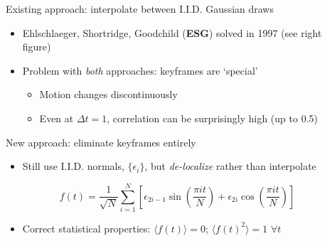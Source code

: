 \documentclass[final,t]{beamer}\usepackage[]{graphicx}\usepackage[]{color}
\newenvironment{knitrout}{}{} %
\begin{document}
\begin{frame}[fragile]
\begin{columns}[T,onlytextwidth]
\begin{column}{.325\linewidth}
\begin{block}{Existing approach:
        interpolate between I.I.D. Gaussian draws}
\begin{knitrout}
\end{knitrout}

        \begin{itemize}
          \item Ehlschlaeger, Shortridge, Goodchild (\textbf{ESG})
            solved in 1997 (see right figure)
          \item Problem with \textit{both} approaches: keyframes are `special'
            \begin{itemize}
              \item Motion changes discontinuously
              \item Even at $\Delta t = 1$, correlation can be surprisingly high
                (up to 0.5)
            \end{itemize}
        \end{itemize}
      \end{block}

      \begin{block}{New approach: eliminate keyframes entirely}
        \begin{itemize}
          \item Still use I.I.D. normals, $\{\epsilon_i\}$,
            but \textit{de-localize} rather than interpolate
        \end{itemize}
        \begin{equation*}
          f(t) = \frac{1}{\sqrt{N}} \sum_{i=1}^N
          \left[
            \epsilon_{2i-1}\sin\left(\frac{\pi i t}{N}\right) +
            \epsilon_{2i}  \cos\left(\frac{\pi i t}{N}\right)
          \right]
        \end{equation*}
        \begin{itemize}
          \item Correct statistical properties: 
            $\langle f(t) \rangle = 0$;
            $\langle f(t)^2 \rangle = 1$ \hspace{2em}
            $\forall t$
        \end{itemize}
      \end{block}

    \end{column}

    \begin{column}{.325\linewidth}


\end{column}
\end{columns}
\end{frame}
\end{document}
